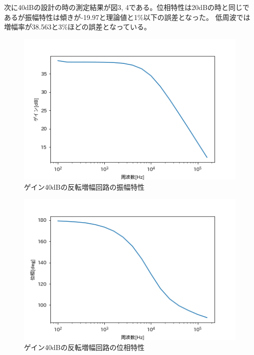 \documentclass[dvipdfmx, twocolumn]{jsarticle}
\begin{document}
\begin{enumerate}
\begin{itemize}
次に40dBの設計の時の測定結果が図3, 4である。位相特性は20dBの時と同じであるが振幅特性は傾きが-19.97と理論値と1\%以下の誤差となった。
低周波では増幅率が38.563と3\%ほどの誤差となっている。


\begin{figure}[H]
\begin{center}
\includegraphics[scale = 0.5]{G40dB.png}
\caption{ゲイン40dBの反転増幅回路の振幅特性}
\end{center}
\end{figure}

\begin{figure}[H]
\begin{center}
\includegraphics[scale = 0.5]{P40dB.png}
\caption{ゲイン40dBの反転増幅回路の位相特性}
\end{center}
\end{figure}


\end{itemize}
\end{enumerate}
\end{document}
